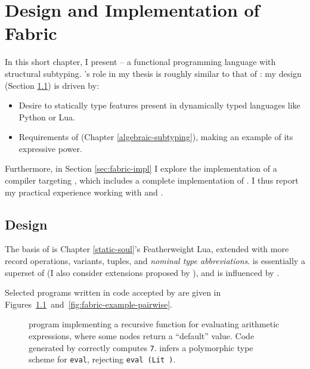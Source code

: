 \chapter{Design and Implementation of Fabric}
\label{fabric}

In this short chapter, I present \textbf{\fabric{}} -- a functional programming language with structural subtyping. 
\fabric{}'s role in my thesis is roughly similar to that of \mlsub{} \cite{dolan-thesis}: my design (Section \ref{sec:fabric-design}) is driven by: \begin{itemize}
    \item Desire to statically type features present in dynamically typed languages like Python or Lua.
    \item Requirements of \inference{} (Chapter \ref{algebraic-subtyping}), making \fabric{} an example of its expressive power.
\end{itemize}
Furthermore, in Section \ref{sec:fabric-impl} I explore the implementation of a \fabric{} compiler targeting \wasm{}, which includes a complete implementation of \inference{}. I thus report my practical experience working with \wasm{} and \inference{}.

\section{Design}
\label{sec:fabric-design}

The basis of \fabric{} is Chapter \ref{static-soul}'s Featherweight Lua, extended with more record operations, variants, tuples, and \emph{nominal type abbreviations}. \fabric{} is essentially a superset of \mlsub{} \cite{mlsub} (I also consider extensions proposed by \textcite{dolan-thesis}), and is influenced by \mlstruct{} \cite{mlstruct}.

Selected \fabric{} programs written in code accepted by \compiler{} are given in Figures~\ref{fig:fabric-example-eval}~and~\ref{fig:fabric-example-pairwise}.

\begin{figure}[p]
    \centering
    
    \caption{\fabric{} program implementing a recursive function for evaluating arithmetic expressions, where some nodes return a \enquote{default} value. Code generated by \compiler{} correctly computes \texttt{7}. \inference{} infers a polymorphic type scheme for \texttt{eval}, \eg{} rejecting \texttt{eval (Lit {})}.}
    \label{fig:fabric-example-eval}
\end{figure}

